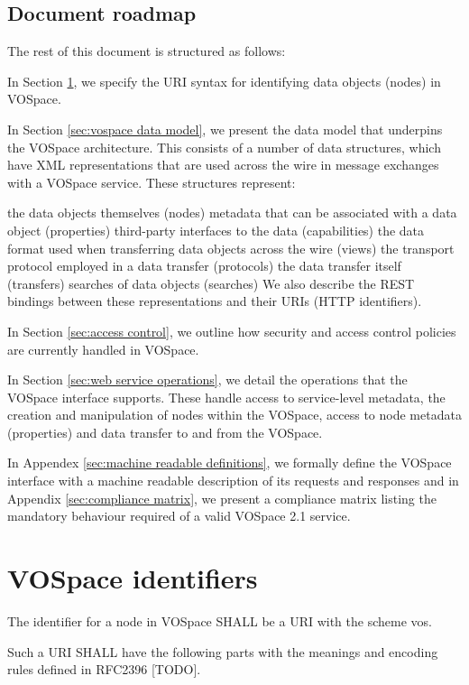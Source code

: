 \documentclass[11pt,a4paper]{ivoa}
\begin{document}
\subsection{Document roadmap}
\label{subsec:document roadmap}
The rest of this document is structured as follows:

In Section \ref{sec:vospace identifiers}, we specify the URI syntax for identifying data objects (nodes) in VOSpace.

In Section \ref{sec:vospace data model}, we present the data model that underpins the VOSpace architecture. This consists of a number of data structures, which have XML representations that are used across the wire in message exchanges with a VOSpace service. These structures represent:

the data objects themselves (nodes)
metadata that can be associated with a data object (properties)
third-party interfaces to the data (capabilities)
the data format used when transferring data objects across the wire (views)
the transport protocol employed in a data transfer (protocols)
the data transfer itself (transfers)
searches of data objects (searches)
We also describe the REST bindings between these representations and their URIs (HTTP identifiers).

In Section \ref{sec:access control}, we outline how security and access control policies are currently handled in VOSpace.

In Section \ref{sec:web service operations}, we detail the operations that the VOSpace interface supports. These handle access to service-level metadata, the creation and manipulation of nodes within the VOSpace, access to node metadata (properties) and data transfer to and from the VOSpace.

In Appendex \ref{sec:machine readable definitions}, we formally define the VOSpace interface with a machine readable description of its requests and responses and in Appendix \ref{sec:compliance matrix}, we present a compliance matrix listing the mandatory behaviour required of a valid VOSpace 2.1 service.

\section{VOSpace identifiers}
\label{sec:vospace identifiers}
The identifier for a node in VOSpace SHALL be a URI with the scheme vos.

Such a URI SHALL have the following parts with the meanings and encoding rules defined in RFC2396 [TODO].
\end{document}
